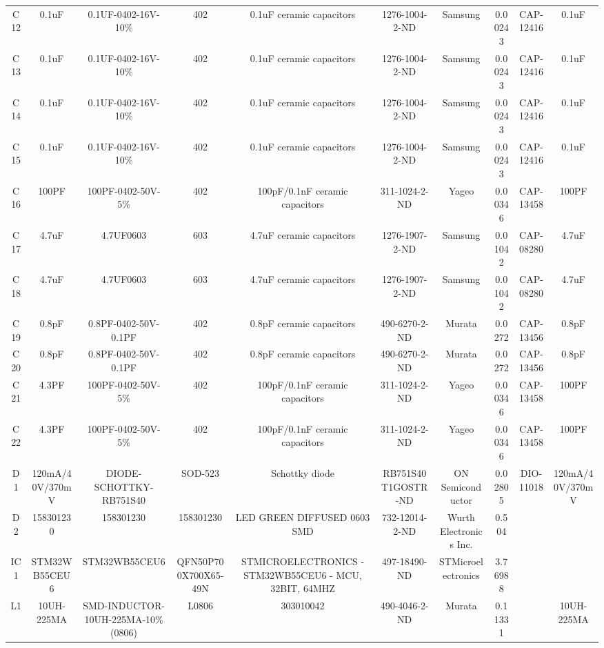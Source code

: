 \documentclass[12pt]{article}
\begin{document}
\begin{appendices}
\begin{table}[htb]
\begin{adjustbox}{angle=-90, scale=0.35, center}
\begin{tabular}{@{}cccccccccc@{}}
        C12 & 0.1uF & 0.1UF-0402-16V-10\% & 402 & 0.1uF ceramic capacitors & 1276-1004-2-ND & Samsung & 0.00243 & CAP-12416 & 0.1uF \\
        C13 & 0.1uF & 0.1UF-0402-16V-10\% & 402 & 0.1uF ceramic capacitors & 1276-1004-2-ND & Samsung & 0.00243 & CAP-12416 & 0.1uF \\
        C14 & 0.1uF & 0.1UF-0402-16V-10\% & 402 & 0.1uF ceramic capacitors & 1276-1004-2-ND & Samsung & 0.00243 & CAP-12416 & 0.1uF \\
        C15 & 0.1uF & 0.1UF-0402-16V-10\% & 402 & 0.1uF ceramic capacitors & 1276-1004-2-ND & Samsung & 0.00243 & CAP-12416 & 0.1uF \\
        C16 & 100PF & 100PF-0402-50V-5\% & 402 & 100pF/0.1nF ceramic capacitors & 311-1024-2-ND & Yageo & 0.00346 & CAP-13458 & 100PF \\
        C17 & 4.7uF & 4.7UF0603 & 603 & 4.7uF ceramic capacitors & 1276-1907-2-ND & Samsung & 0.01042 & CAP-08280 & 4.7uF \\
        C18 & 4.7uF & 4.7UF0603 & 603 & 4.7uF ceramic capacitors & 1276-1907-2-ND & Samsung & 0.01042 & CAP-08280 & 4.7uF \\
        C19 & 0.8pF & 0.8PF-0402-50V-0.1PF & 402 & 0.8pF ceramic capacitors & 490-6270-2-ND & Murata & 0.0272 & CAP-13456 & 0.8pF \\
        C20 & 0.8pF & 0.8PF-0402-50V-0.1PF & 402 & 0.8pF ceramic capacitors & 490-6270-2-ND & Murata & 0.0272 & CAP-13456 & 0.8pF \\
        C21 & 4.3PF & 100PF-0402-50V-5\% & 402 & 100pF/0.1nF ceramic capacitors & 311-1024-2-ND & Yageo & 0.00346 & CAP-13458 & 100PF \\
        C22 & 4.3PF & 100PF-0402-50V-5\% & 402 & 100pF/0.1nF ceramic capacitors & 311-1024-2-ND & Yageo & 0.00346 & CAP-13458 & 100PF \\
        D1 & 120mA/40V/370mV & DIODE-SCHOTTKY-RB751S40 & SOD-523 & Schottky diode & RB751S40T1GOSTR-ND & ON Semiconductor & 0.02805 & DIO-11018 & 120mA/40V/370mV \\
        D2 & 158301230 & 158301230 & 158301230 & LED GREEN DIFFUSED 0603 SMD & 732-12014-2-ND & Wurth Electronics Inc. & 0.504 &  &  \\
        IC1 & STM32WB55CEU6 & STM32WB55CEU6 & QFN50P700X700X65-49N & STMICROELECTRONICS - STM32WB55CEU6 - MCU, 32BIT, 64MHZ & 497-18490-ND & STMicroelectronics & 3.76988 &  &  \\
        L1 & 10UH-225MA & SMD-INDUCTOR-10UH-225MA-10\%(0806) & L0806 & 303010042 & 490-4046-2-ND & Murata & 0.11331 &  & 10UH-225MA \\

\end{tabular}
\end{adjustbox}
\end{table}
\end{appendices}
\end{document}
